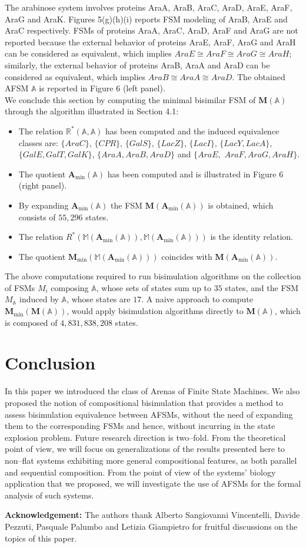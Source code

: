 \documentclass{amsart}
\theoremstyle{definition}
\theoremstyle{remark}
\numberwithin{equation}{section}
\begin{document}
The arabinose system involves proteins AraA, AraB, AraC, AraD, AraE, AraF, AraG and AraK. 
Figures 5(g)(h)(i) reports FSM modeling of AraB, AraE and AraC respectively. FSMs of proteins AraA, AraC, AraD, AraF and AraG are not reported because the external behavior of proteins AraE, AraF, AraG and AraH can be considered as equivalent, which implies $AraE \cong AraF \cong Ara G \cong AraH$; similarly, the external behavior of proteins AraB, AraA and AraD can be considered as equivalent, which implies $AraB \cong AraA \cong AraD$. 
The obtained AFSM $\mathbb{A}$ is reported in Figure 6 (left panel). \\ 
We conclude this section by computing the minimal bisimilar FSM of $\mathbf{M}(\mathbb{A})$ through the algorithm illustrated in Section 4.1: 
\begin{itemize} 
\item The relation $\mathbb{R}^{\ast}(\mathbb{A},\mathbb{A})$ has been computed and the induced equivalence classes are: $\{AraC\}$, $\{CPR\}$, $\{GalS\}$, $\{LacZ\}$, $\{LacI\}$, $\{LacY,Lac A\}$, $\{GalE,GalT,GalK\}$, $\{AraA,AraB,AraD\}$ and $\{AraE,$ $AraF,AraG,AraH\}$. 
\item The quotient $\mathbf{A}_{\min}(\mathbb{A})$ has been computed and is illustrated in Figure 6 (right panel). 
\item By expanding $\mathbf{A}_{\min}(\mathbb{A})$ the FSM $\mathbf{M}(\mathbf{A}_{\min}(\mathbb{A}))$ is obtained, which consists of $55,296$ states. 
\item The relation $R^{\ast}(\mathbb{M}(\mathbf{A}_{\min}(\mathbb{A})),\mathbb{M}(\mathbf{A}_{\min}(\mathbb{A})))$ is the identity relation.
\item The quotient $\mathbf{M}_{\min}(\mathbb{M}(\mathbf{A}_{\min}(\mathbb{A})))$ coincides with $\mathbf{M}(\mathbf{A}_{\min}(\mathbb{A}))$.
\end{itemize}
The above computations required to run bisimulation algorithms on the collection of FSMs $M_{i}$ composing $\mathbb{A}$, whose sets of states sum up to $35$ states, and the FSM $M_{\mathbb{A}}$ induced by $\mathbb{A}$, whose states are $17$. A naive approach to compute $\mathbf{M}_{\min}(\mathbf{M}(\mathbb{A}))$, would apply bisimulation algorithms directly to $\mathbf{M}(\mathbb{A})$, which is composed of $4,831,838,208$ states. 

\section{Conclusion}
In this paper we introduced the class of Arenas of Finite State Machines. We also proposed the notion of compositional bisimulation that 
provides a method to assess bisimulation equivalence between AFSMs, without the need of expanding them to the corresponding FSMs and hence, without incurring in the state explosion problem. Future research direction is two--fold. From the theoretical point of view, we will focus on generalizations of the results presented here to non--flat systems exhibiting more general compositional features, as both parallel and sequential composition. From the point of view of the systems' biology application that we proposed, we will investigate the use of AFSMs for the formal analysis of such systems.

\textbf{Acknowledgement:} The authors thank Alberto Sangiovanni Vincentelli, Davide Pezzuti, Pasquale Palumbo and Letizia Giampietro for fruitful discussions on the topics of this paper.



\end{document}
